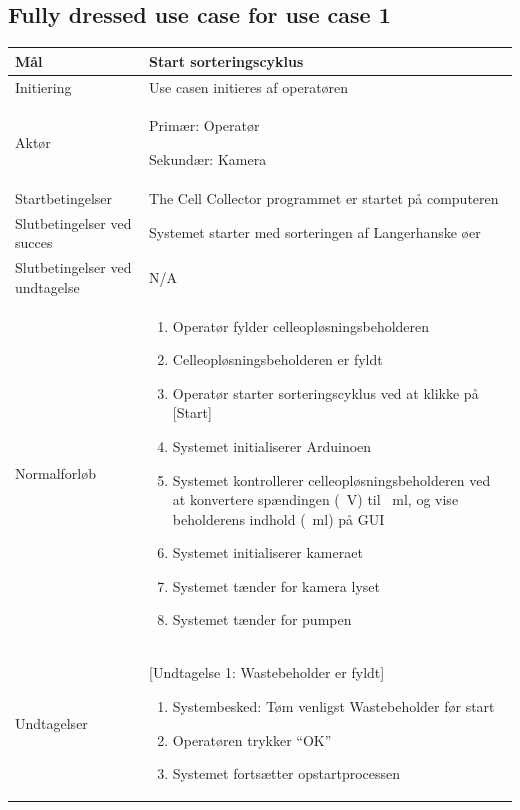 \subsection{Fully dressed use case for use case 1}
\begin{center}
		\begin{longtable}{ | m{4cm} | m{8cm}| } 
			\hline
			Mål & Start sorteringscyklus \\ 
			\hline
			Initiering &  Use casen initieres af operatøren\\
			\hline
			Aktør & 
			Primær: Operatør
			
			 Sekundær: Kamera			  \\ 
			\hline
			Startbetingelser & The Cell Collector programmet er startet på computeren \\ 
			\hline	
			Slutbetingelser ved succes & Systemet starter med sorteringen af Langerhanske øer \\
			\hline
			Slutbetingelser ved undtagelse & N/A \\
			\hline
			Normalforløb & \begin{enumerate}
				\item Operatør fylder celleopløsningsbeholderen
				\item Celleopløsningsbeholderen er fyldt
				\item Operatør starter sorteringscyklus ved at klikke på [Start]
				\subitem [Undtagelse 1: Wastebeholder er fyldt] 
				\item Systemet initialiserer Arduinoen
				\subitem [Undtagelse 2: Ingen forbindelse til Arduino]
				\item Systemet kontrollerer celleopløsningsbeholderen ved at konvertere spændingen (\SI{}{\volt})  til \SI{}{\milli\litre}, og vise beholderens indhold (\SI{}{\milli\litre}) på GUI
				\item Systemet initialiserer kameraet
				\subitem [Undtagelse 3: Kameraet initialiserer ikke]
				\item Systemet tænder for kamera lyset
				\item Systemet tænder for pumpen
				
			\end{enumerate} \\ 
			\hline
			Undtagelser & [Undtagelse 1: Wastebeholder er fyldt] 
			
			\begin{enumerate}
			\item Systembesked: Tøm venligst Wastebeholder før start
			\item Operatøren trykker “OK”
			\item Systemet fortsætter opstartprocessen
			\end{enumerate} 
			

\end{longtable}
\end{center}
